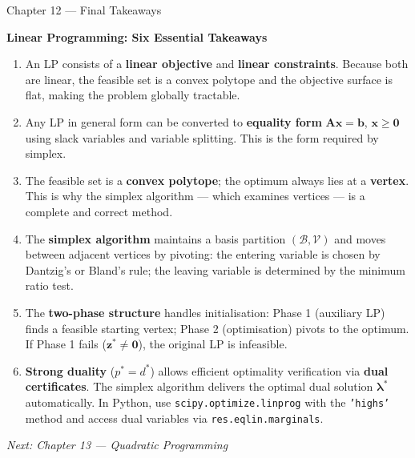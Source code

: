 \documentclass[aspectratio=169,10pt]{beamer}
\newcommand{\xv}{\mathbf{x}}
\newcommand{\bv}{\mathbf{b}}
\newcommand{\Av}{\mathbf{A}}
\newcommand{\zv}{\mathbf{z}}
\newcommand{\lav}{\boldsymbol{\lambda}}
\newcommand{\calB}{\mathcal{B}}
\newcommand{\calV}{\mathcal{V}}
\begin{document}
\begin{frame}[allowframebreaks]{Chapter 12 --- Final Takeaways}
  \begin{center}
    \large\textbf{Linear Programming: Six Essential Takeaways}
  \end{center}
  \vspace{6pt}

  \begin{enumerate}
    \setlength\itemsep{8pt}

    \item An LP consists of a \textbf{linear objective} and \textbf{linear constraints}.
          Because both are linear, the feasible set is a convex polytope and the
          objective surface is flat, making the problem globally tractable.

    \item Any LP in general form can be converted to \textbf{equality form}
          $\Av\xv = \bv$, $\xv \ge \mathbf{0}$ using slack variables and
          variable splitting.  This is the form required by simplex.

    \item The feasible set is a \textbf{convex polytope}; the optimum always lies
          at a \textbf{vertex}.  This is why the simplex algorithm --- which examines
          vertices --- is a complete and correct method.

    \item The \textbf{simplex algorithm} maintains a basis partition $(\calB, \calV)$
          and moves between adjacent vertices by pivoting: the entering variable
          is chosen by Dantzig's or Bland's rule; the leaving variable is determined
          by the minimum ratio test.

    \item The \textbf{two-phase structure} handles initialisation: Phase 1 (auxiliary LP)
          finds a feasible starting vertex; Phase 2 (optimisation) pivots to the optimum.
          If Phase 1 fails ($\zv^* \ne \mathbf{0}$), the original LP is infeasible.

    \item \textbf{Strong duality} ($p^* = d^*$) allows efficient optimality verification
          via \textbf{dual certificates}.  The simplex algorithm delivers the optimal
          dual solution $\lav^*$ automatically.  In Python, use
          \texttt{scipy.optimize.linprog} with the \texttt{'highs'} method and access
          dual variables via \texttt{res.eqlin.marginals}.
  \end{enumerate}

  \vspace{8pt}
  \begin{center}
    \textit{Next: Chapter 13 --- Quadratic Programming}
  \end{center}

\end{frame}

\end{document}
